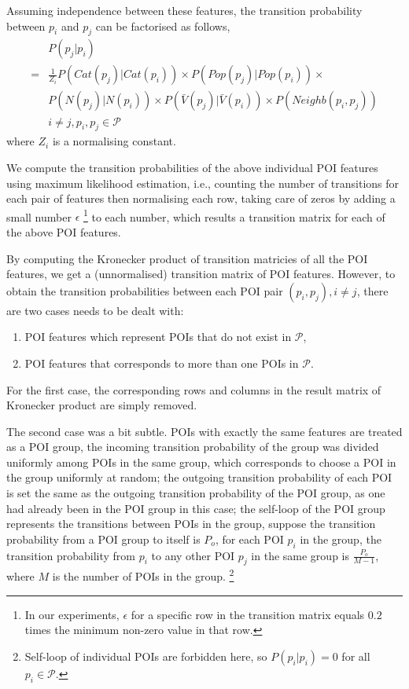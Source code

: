 Assuming independence between these features,
the transition probability between $p_i$ and $p_j$ can be factorised as follows,
\begin{align*}
    & P(p_j | p_i) \\
   =& \frac{1}{Z_i} P(Cat(p_j) | Cat(p_i)) \times P(Pop(p_j) | Pop(p_i)) \times \\
    & P(N(p_j) | N(p_i)) \times P(\bar{V}(p_j) | \bar{V}(p_i)) \times P(Neighb(p_i, p_j)) \\
    & i \ne j, p_i, p_j \in \mathcal{P}
\end{align*}
where $Z_i$ is a normalising constant.


We compute the transition probabilities of the above individual POI features 
using maximum likelihood estimation, 
i.e., counting the number of transitions for each pair of features then normalising each row,
taking care of zeros by adding a small number $\epsilon$
\footnote{In our experiments, $\epsilon$ for a specific row in the transition matrix equals $0.2$ times 
the minimum non-zero value in that row.}
to each number,
which results a transition matrix for each of the above POI features.

By computing the Kronecker product of transition matricies of all the POI features,
we get a (unnormalised) transition matrix of POI features.
However, to obtain the transition probabilities between each POI pair $(p_i, p_j), i \ne j$,
there are two cases needs to be dealt with:
\begin{enumerate}
\item POI features which represent POIs that do not exist in $\mathcal{P}$,
\item POI features that corresponds to more than one POIs in $\mathcal{P}$.
\end{enumerate}

For the first case, 
the corresponding rows and columns in the result matrix of Kronecker product are simply removed.

The second case was a bit subtle.
POIs with exactly the same features are treated as a POI group,
the incoming transition probability of the group was divided uniformly among POIs in the same group,
which corresponds to choose a POI in the group uniformly at random;
the outgoing transition probability of each POI is set the same as the outgoing transition probability of the POI group,
as one had already been in the POI group in this case;
the self-loop of the POI group represents the transitions between POIs in the group,
suppose the transition probability from a POI group to itself is $P_o$,
for each POI $p_i$ in the group, the transition probability from $p_i$ to any other POI $p_j$ in the same group
is $\frac{P_o}{M-1}$, where $M$ is the number of POIs in the group.
\footnote{Self-loop of individual POIs are forbidden here, so $P(p_i | p_i) = 0$ for all $p_i \in \mathcal{P}$.}

